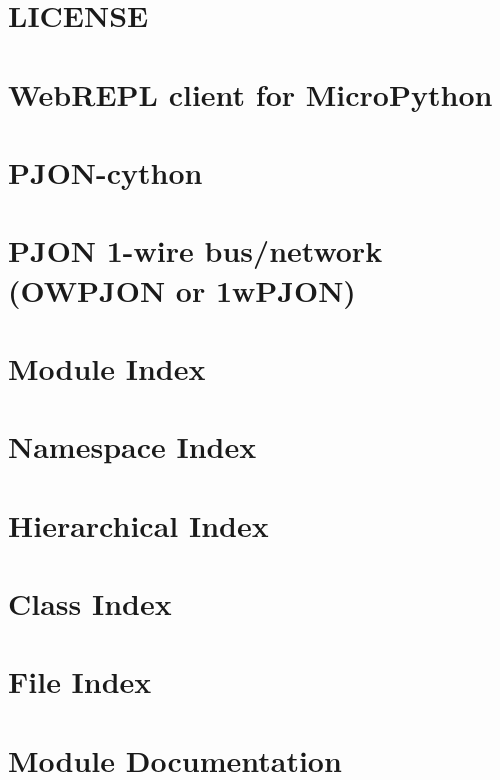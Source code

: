 \documentclass[twoside]{book}
\begin{document}
\chapter{L\-I\-C\-E\-N\-S\-E}
\label{md_LICENSE}
\hypertarget{md_LICENSE}{}

\chapter{Web\-R\-E\-P\-L client for Micro\-Python}
\label{md_micpy_webrepl-master_README}
\hypertarget{md_micpy_webrepl-master_README}{}

\chapter{P\-J\-O\-N-\/cython}
\label{md_OWPJON_PJON-cython_README}
\hypertarget{md_OWPJON_PJON-cython_README}{}

\chapter{P\-J\-O\-N 1-\/wire bus/network (O\-W\-P\-J\-O\-N or 1w\-P\-J\-O\-N)}
\label{md_OWPJON_README}
\hypertarget{md_OWPJON_README}{}

\chapter{Module Index}

\chapter{Namespace Index}

\chapter{Hierarchical Index}

\chapter{Class Index}

\chapter{File Index}

\chapter{Module Documentation}

\end{document}
